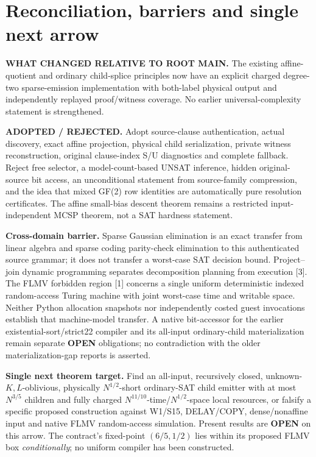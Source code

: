 \documentclass[11pt]{article}
\begin{document}
\section{Reconciliation, barriers and single next arrow}
\textbf{WHAT CHANGED RELATIVE TO ROOT MAIN.} The existing affine-quotient and ordinary child-splice principles now have an explicit charged degree-two sparse-emission implementation with both-label physical output and independently replayed proof/witness coverage. No earlier universal-complexity statement is strengthened.

\textbf{ADOPTED / REJECTED.} Adopt source-clause authentication, actual discovery, exact affine projection, physical child serialization, private witness reconstruction, original clause-index S/U diagnostics and complete fallback. Reject free selector, a model-count-based UNSAT inference, hidden original-source bit access, an unconditional statement from source-family compression, and the idea that mixed GF(2) row identities are automatically pure resolution certificates. The affine small-bias descent theorem remains a restricted input-independent MCSP theorem, not a SAT hardness statement.

\textbf{Cross-domain barrier.} Sparse Gaussian elimination is an exact transfer from linear algebra and sparse coding parity-check elimination to this authenticated source grammar; it does not transfer a worst-case SAT decision bound. Project--join dynamic programming separates decomposition planning from execution [3]. The FLMV forbidden region [1] concerns a single uniform deterministic indexed random-access Turing machine with joint worst-case time and writable space. Neither Python allocation snapshots nor independently costed guest invocations establish that machine-model transfer. A native bit-accessor for the earlier existential-sort/strict22 compiler and its all-input ordinary-child materialization remain separate \textbf{OPEN} obligations; no contradiction with the older materialization-gap reports is asserted.

\noindent\textbf{Single next theorem target.} Find an all-input, recursively closed, unknown-$K,L$-oblivious, physically $N^{1/2}$-short ordinary-SAT child emitter with at most $N^{3/5}$ children and fully charged $N^{11/10}$-time/$N^{1/2}$-space local resources, or falsify a specific proposed construction against W1/S15, DELAY/COPY, dense/nonaffine input and native FLMV random-access simulation. Present results are \textbf{OPEN} on this arrow. The contract's fixed-point $(6/5,1/2)$ lies within its proposed FLMV box \emph{conditionally}; no uniform compiler has been constructed.\par
\end{document}
